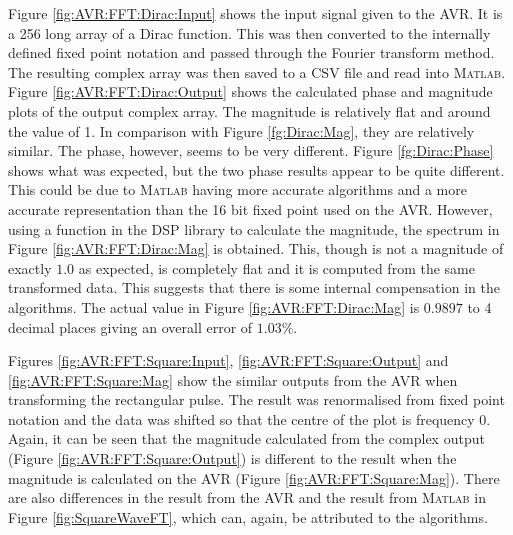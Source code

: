 Figure \ref{fig:AVR:FFT:Dirac:Input} shows the input signal given to the AVR. It is a 256 long array of a Dirac function. This was then converted to the internally defined fixed point notation and passed through the Fourier transform method. The resulting complex array was then saved to a CSV file and read into \textsc{Matlab}. Figure \ref{fig:AVR:FFT:Dirac:Output} shows the calculated phase and magnitude plots of the output complex array. The magnitude is relatively flat and around the value of 1. In comparison with Figure \ref{fg:Dirac:Mag}, they are relatively similar. The phase, however, seems to be very different. Figure \ref{fg:Dirac:Phase} shows what was expected, but the two phase results appear to be quite different. This could be due to \textsc{Matlab} having more accurate algorithms and a more accurate representation than the 16 bit fixed point used on the AVR. However, using a function in the DSP library to calculate the magnitude, the spectrum in Figure \ref{fig:AVR:FFT:Dirac:Mag} is obtained. This, though is not a magnitude of exactly $1.0$ as expected, is completely flat and it is computed from the same transformed data. This suggests that there is some internal compensation in the algorithms. The actual value in Figure \ref{fig:AVR:FFT:Dirac:Mag} is $0.9897$ to 4 decimal places giving an overall error of $1.03\%$. 

Figures \ref{fig:AVR:FFT:Square:Input}, \ref{fig:AVR:FFT:Square:Output} and \ref{fig:AVR:FFT:Square:Mag} show the similar outputs from the AVR when transforming the rectangular pulse. The result was renormalised from fixed point notation and the data was shifted so that the centre of the plot is frequency 0.  Again, it can be seen that the magnitude calculated from the complex output (Figure \ref{fig:AVR:FFT:Square:Output}) is different to the result when the magnitude is calculated on the AVR (Figure \ref{fig:AVR:FFT:Square:Mag}). There are also differences in the result from the AVR and the result from \textsc{Matlab} in Figure \ref{fig:SquareWaveFT}, which can, again, be attributed to the algorithms. 

